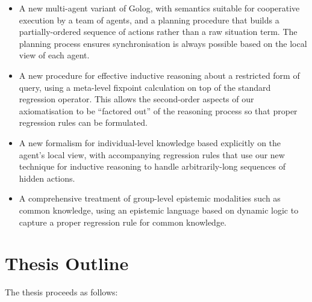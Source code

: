 \begin{itemize}
\item A new multi-agent variant of Golog, with semantics suitable for cooperative
execution by a team of agents, and a planning procedure that builds
a partially-ordered sequence of actions rather than a raw situation
term. The planning process ensures synchronisation is always possible
based on the local view of each agent. 
\item A new procedure for effective inductive reasoning about a restricted
form of query, using a meta-level fixpoint calculation on top of the
standard regression operator. This allows the second-order aspects
of our axiomatisation to be {}``factored out'' of the reasoning
process so that proper regression rules can be formulated. 
\item A new formalism for individual-level knowledge based explicitly on
the agent's local view, with accompanying regression rules that use
our new technique for inductive reasoning to handle arbitrarily-long
sequences of hidden actions. 
\item A comprehensive treatment of group-level epistemic modalities such
as common knowledge, using an epistemic language based on dynamic
logic to capture a proper regression rule for common knowledge. 
\end{itemize}
\newpage{}


\section{Thesis Outline}

The thesis proceeds as follows:


